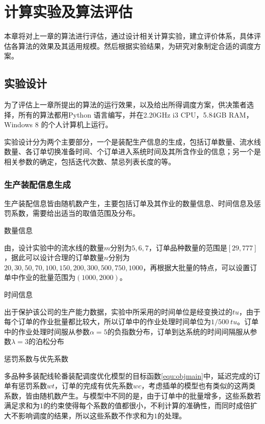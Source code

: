 \chapter{计算实验及算法评估}
本章将对上一章的算法进行评估，通过设计相关计算实验，建立评价体系，具体评估各算法的效果及其适用规模。然后根据实验结果，为研究对象制定合适的调度方案。
\section{实验设计}
为了评估上一章所提出的算法的运行效果，以及给出所得调度方案，供决策者选择，所有的算法都用Python 语言编写，并在2.20GHz i3 CPU，5.84GB RAM，Windows 8 的个人计算机上运行。

实验设计分为两个主要部分，一个是装配生产信息的生成，包括订单数量、流水线数量、各订单切换准备时间、个订单进入系统时间及其所含作业的信息；另一个是相关参数的确定，包括迭代次数、禁忌列表长度的等。
\subsection{生产装配信息生成}
生产装配信息皆由随机数产生，主要包括订单及其作业的数量信息、时间信息及惩罚系数，需要给出适当的取值范围及分布。
\begin{asparaenum}
\item 数量信息

由，设计实验中的流水线的数量$m$分别为$5,6,7$，订单品种数量的范围是$[29,777]$，据此可以设计合理的订单数量$n$分别为$20,30,50,70,100,150,200,300,500,750,1000$，再根据大批量的特点，可以设置订单中作业的批量范围为$(1000,2000)$。
\item 时间信息

出于保护该公司的生产能力数据，实验中所采用的时间单位是经变换过的$tu$，由于每个订单的作业批量都比较大，所以订单中的作业处理时间单位为$1/500\ tu$。订单中的作业处理时间服从参数$\alpha = 5$的负指数分布，订单到达系统的时间间隔服从参数$\lambda = 3$的泊松分布
\item 惩罚系数与优先系数
\end{asparaenum}

多品种多装配线轮番装配调度优化模型的目标函数\eqref{equ:objmain}中，延迟完成的订单有惩罚系数$wt$，订单的完成有优先系数$wc$，考虑插单的模型也有类似的这两类系数，皆由随机数产生。与模型中不同的是，由于订单中的批量增多，这些系数若满足求和为$1$的约束使得每个系数的值都很小，不利计算的准确性，而同时成倍扩大不影响调度的结果，所以这些系数不作求和为$1$的处理。

